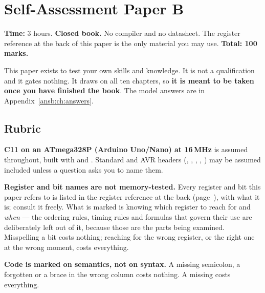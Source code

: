 
\chapter{Self-Assessment Paper B}
\label{exb:ch:paper}

\noindent\textbf{Time:} 3 hours. \textbf{Closed book.} No compiler and no datasheet. The register
reference at the back of this paper is the only material you may use. \textbf{Total: 100 marks.}

This paper exists to test your own skills and knowledge. It is not a qualification and it gates
nothing. It draws on all ten chapters, so \textbf{it is meant to be taken once you have finished
the book}. The model answers are in Appendix~\ref{ansb:ch:answers}.

\section*{Rubric}
\textbf{C11 on an ATmega328P (Arduino Uno/Nano) at 16\,MHz} is assumed throughout, built with
 and . Standard and AVR headers (,
, , , ) may be
assumed included unless a question asks you to name them.

\textbf{Register and bit names are not memory-tested.} Every register and bit this paper refers to
is listed in the register reference at the back (page~\pageref{exb:sec:registers}), with what it
is; consult it freely. What is marked is knowing which register to reach for and \emph{when} ---
the ordering rules, timing rules and formulas that govern their use are deliberately left out of
it, because those are the parts being examined. Misspelling a bit costs nothing; reaching for the
wrong register, or the right one at the wrong moment, costs everything.

\textbf{Code is marked on semantics, not on syntax.} A missing semicolon, a forgotten
 or a brace in the wrong column costs nothing. A missing  costs
everything.

